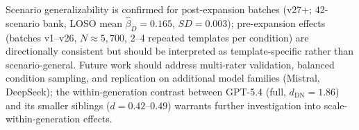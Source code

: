 \documentclass[conference,10pt]{IEEEtran}
\begin{document}
Scenario generalizability is confirmed for post-expansion batches (v27+; 42-scenario bank, LOSO mean $\hat{\beta}_D=0.165$, $SD=0.003$); pre-expansion effects (batches v1--v26, $N\approx5{,}700$, 2--4 repeated templates per condition) are directionally consistent but should be interpreted as template-specific rather than scenario-general.
Future work should address multi-rater validation, balanced condition sampling, and replication on additional model families (Mistral, DeepSeek); the within-generation contrast between GPT-5.4 (full, $d_\text{DN}=1.86$) and its smaller siblings ($d=0.42$--$0.49$) warrants further investigation into scale-within-generation effects.



\end{document}
